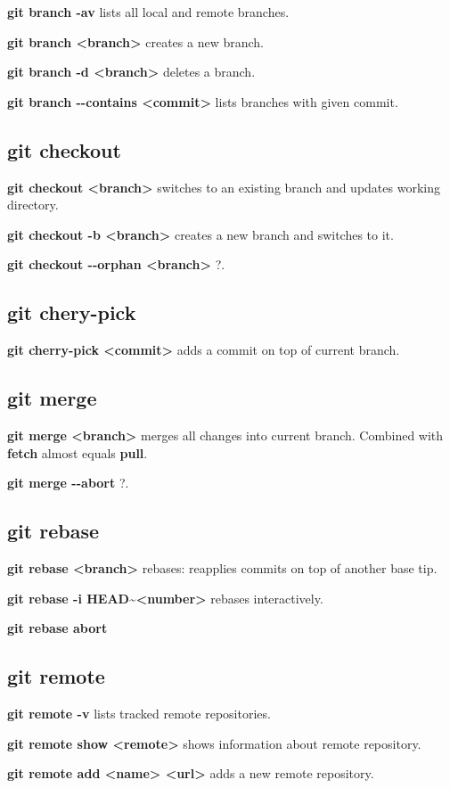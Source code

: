 \documentclass{programmingnotes}
\begin{document}
\begin{multicols*}{3}
\textbf{git branch -av} lists all local and remote branches.

\textbf{git branch <branch>} creates a new branch.

\textbf{git branch -d <branch>} deletes a branch.

\textbf{git branch -{}-contains <commit>} lists branches with given commit.

\subsection*{\dotfill git checkout}
\textbf{git checkout <branch>} switches to an existing branch and updates working directory.

\textbf{git checkout -b <branch>} creates a new branch and switches to it.

\textbf{git checkout -{}-orphan <branch>} ?.

\subsection*{\dotfill git chery-pick}
\textbf{git cherry-pick <commit>} adds a commit on top of current branch.

\subsection*{\dotfill git merge}
\textbf{git merge <branch>} merges all changes into current branch.
Combined with \textbf{fetch} almost equals \textbf{pull}.

\textbf{git merge -{}-abort} ?.

\subsection*{\dotfill git rebase}
\textbf{git rebase <branch>} rebases: reapplies commits on top of another base tip.

\textbf{git rebase -i HEAD\textasciitilde<number>} rebases interactively.

\textbf{git rebase abort}

\subsection*{\dotfill git remote}
\textbf{git remote -v} lists tracked remote repositories.

\textbf{git remote show <remote>} shows information about remote repository.

\textbf{git remote add <name> <url>} adds a new remote repository.


\end{multicols*}
\end{document}
